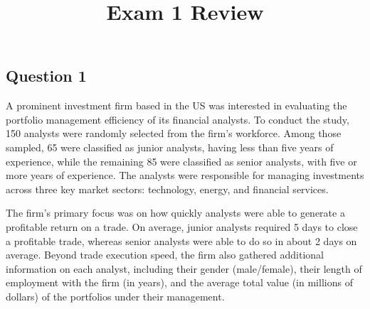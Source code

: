 \documentclass[
  letterpaper,
  DIV=11,
  numbers=noendperiod]{scrartcl}
\title{Exam 1 Review}
\author{}
\date{}
\begin{document}
\maketitle


\subsection{Question 1}\label{question-1}

A prominent investment firm based in the US was interested in evaluating
the portfolio management efficiency of its financial analysts. To
conduct the study, 150 analysts were randomly selected from the firm's
workforce. Among those sampled, 65 were classified as junior analysts,
having less than five years of experience, while the remaining 85 were
classified as senior analysts, with five or more years of experience.
The analysts were responsible for managing investments across three key
market sectors: technology, energy, and financial services.

The firm's primary focus was on how quickly analysts were able to
generate a profitable return on a trade. On average, junior analysts
required 5 days to close a profitable trade, whereas senior analysts
were able to do so in about 2 days on average. Beyond trade execution
speed, the firm also gathered additional information on each analyst,
including their gender (male/female), their length of employment with
the firm (in years), and the average total value (in millions of
dollars) of the portfolios under their management.
\end{document}

